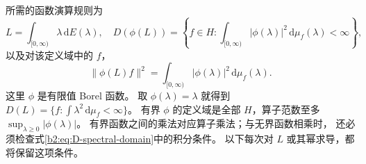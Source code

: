 所需的函数演算规则为
\begin{equation}\label{b2:eq:D-spectral-domain}
 L=\int_{[0,\infty)}\lambda\,\mathrm dE(\lambda),
 \quad
 D(\phi(L))=
 \left\{f\in H:\int_{[0,\infty)}|\phi(\lambda)|^2
                       \,\mathrm d\mu_f(\lambda)<\infty\right\},
\end{equation}
以及对该定义域中的 \(f\)，
\begin{equation}\label{b2:eq:D-spectral-norm}
 \|\phi(L)f\|^2
 =\int_{[0,\infty)}|\phi(\lambda)|^2\,\mathrm d\mu_f(\lambda).
\end{equation}
这里 \(\phi\) 是有限值 Borel 函数。
取 \(\phi(\lambda)=\lambda\) 就得到
\(D(L)=\{f:\int\lambda^2\,\mathrm d\mu_f<\infty\}\)。
有界 \(\phi\) 的定义域是全部 \(H\)，算子范数至多
\(\sup_{\lambda\ge0}|\phi(\lambda)|\)。
有界函数之间的乘法对应算子乘法；与无界函数相乘时，
还必须检查式\eqref{b2:eq:D-spectral-domain}中的积分条件。
以下每次对 \(L\) 或其幂求导，都将保留这项条件。


